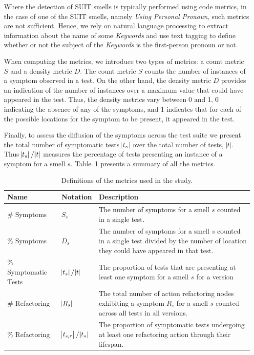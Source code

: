 Where the detection of SUIT smells is typically performed using code metrics, in the case of one of the SUIT smells, namely \emph{Using Personal Pronoun}, such metrics are not sufficient. Hence, we rely on natural language processing to extract information about the name of some \emph{Keywords} and use text tagging to define whether or not the subject of the \emph{Keywords} is the first-person pronoun or not.

When computing the metrics, we introduce two types of metrics: a count metric $S$ and a density metric $D$. The count metric $S$ counts the number of instances of a symptom observed in a test. On the other hand, the density metric $D$ provides an indication of the number of instances over a maximum value that could have appeared in the test. Thus, the density metrics vary between 0 and 1, 0 indicating the absence of any of the symptoms, and 1 indicates that for each of the possible locations for the symptom to be present, it appeared in the test.

Finally, to assess the diffusion of the symptoms across the test suite we present the total number of symptomatic tests $\abs{t_s}$ over the total number of tests, $\abs{t}$. Thus $\abs{t_s} / \abs{t}$ measures the percentage of tests presenting an instance of a symptom for a smell $s$. Table~\ref{tab:metrics} presents a summary of all the metrics.

\begin{table}
\centering

\caption{Definitions of the metrics used in the study.}
\label{tab:metrics}

\begin{tabular}{>{\raggedright}p{1.2in}>{\raggedright}p{0.6in}>{\raggedright}p{3in}}

\toprule
\scriptsize{\textbf{Name}} & \scriptsize{\textbf{Notation}} & \scriptsize{\textbf{Description}} \tabularnewline
\toprule

\scriptsize{\# Symptoms} & \scriptsize{$S_s$} & \scriptsize{The number of symptoms for a smell $s$ counted in a single test.} \tabularnewline
\scriptsize{\% Symptoms} & \scriptsize{$D_s$} & \scriptsize{The number of symptoms for a smell $s$ counted in a single test divided by the number of location they could have appeared in that test.} \tabularnewline
\scriptsize{\% Symptomatic Tests} & \scriptsize{$\abs{t_s} / \abs{t}$} & \scriptsize{The proportion of tests that are presenting at least one symptom for a smell $s$ for a version} \tabularnewline
\scriptsize{\# Refactoring} & \scriptsize{$\abs{R_{s}}$} & \scriptsize{The total number of action refactoring nodes exhibiting a symptom $R_{s}$ for a smell $s$ counted across all tests in all versions.} \tabularnewline
\scriptsize{\% Refactoring} & \scriptsize{$\abs{t_{s,r}} / \abs{t_{s}}$} & \scriptsize{The proportion of symptomatic tests undergoing at least one refactoring action through their lifespan.} \tabularnewline
\bottomrule

\end{tabular}

\end{table}


